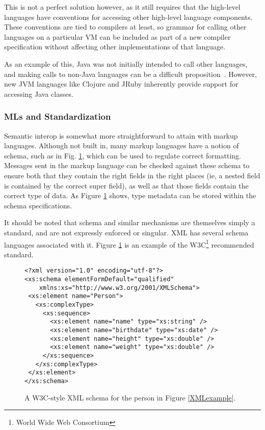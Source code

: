 \documentclass{sig-alternate}
\begin{document}
This is not a perfect solution however, as it still requires that the high-level languages have conventions for accessing other high-level language components.
These conventions are tied to compilers at least, so grammar for calling other languages on a particular VM can be included as part of a new compiler specification without affecting other implementations of that language.

As an example of this, Java was not initially intended to call other languages, and making calls to non-Java languages can be a difficult proposition~\cite{Chisnall:2013}. However, new JVM languages like Clojure and JRuby inherently provide support for accessing Java classes.


\subsubsection*{MLs and Standardization}
Semantic interop is somewhat more straightforward to attain with markup languages. Although not built in, many markup languages have a notion of schema, such as in Fig. \ref{XMLschema}, which can be used to regulate correct formatting. Messages sent in the markup language can be checked against these schema to ensure both that they contain the right fields in the right places (ie, a nested field is contained by the correct super field), as well as that those fields contain the correct type of data. As Figure \ref{XMLschema} shows, type metadata can be stored within the schema specifications.

It should be noted that schema and similar mechanisms are themselves simply a standard, and are not expressly enforced or singular. XML has several schema languages associated with it. Figure \ref{XMLschema} is an example of the W3C\footnote{World Wide Web Consortium} recommended standard.


\begin{figure}
\begin{verbatim}
<?xml version="1.0" encoding="utf-8"?>
<xs:schema elementFormDefault="qualified"
    xmlns:xs="http://www.w3.org/2001/XMLSchema">
 <xs:element name="Person">
   <xs:complexType>
     <xs:sequence>
       <xs:element name="name" type="xs:string" />
       <xs:element name="birthdate" type="xs:date" />
       <xs:element name="height" type="xs:double" />
       <xs:element name="weight" type="xs:double" />
     </xs:sequence>
   </xs:complexType>
 </xs:element>
</xs:schema>
\end{verbatim}
\caption{A W3C-style XML schema for the person in Figure \ref{XMLexample}.}
\label{XMLschema}
\end{figure}
\end{document}
